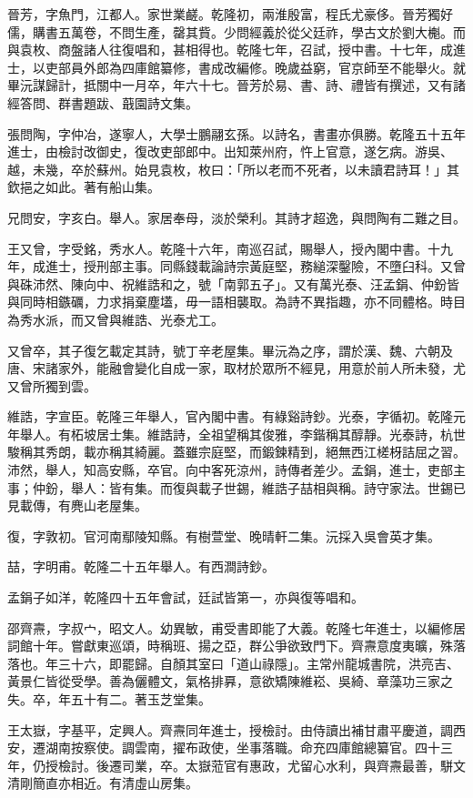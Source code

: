 \begin{pinyinscope}
晉芳，字魚門，江都人。家世業鹺。乾隆初，兩淮殷富，程氏尤豪侈。晉芳獨好儒，購書五萬卷，不問生產，罄其貲。少問經義於從父廷祚，學古文於劉大櫆。而與袁枚、商盤諸人往復唱和，甚相得也。乾隆七年，召試，授中書。十七年，成進士，以吏部員外郎為四庫館纂修，書成改編修。晚歲益窮，官京師至不能舉火。就畢沅謀歸計，抵關中一月卒，年六十七。晉芳於易、書、詩、禮皆有撰述，又有諸經答問、群書題跋、蕺園詩文集。

張問陶，字仲冶，遂寧人，大學士鵬翮玄孫。以詩名，書畫亦俱勝。乾隆五十五年進士，由檢討改御史，復改吏部郎中。出知萊州府，忤上官意，遂乞病。游吳、越，未幾，卒於蘇州。始見袁枚，枚曰：「所以老而不死者，以未讀君詩耳！」其欽挹之如此。著有船山集。

兄問安，字亥白。舉人。家居奉母，淡於榮利。其詩才超逸，與問陶有二難之目。

王又曾，字受銘，秀水人。乾隆十六年，南巡召試，賜舉人，授內閣中書。十九年，成進士，授刑部主事。同縣錢載論詩宗黃庭堅，務縋深鑿險，不墮臼科。又曾與硃沛然、陳向中、祝維誥和之，號「南郭五子」。又有萬光泰、汪孟鋗、仲鈖皆與同時相鏃礪，力求捐棄塵壒，毋一語相襲取。為詩不異指趣，亦不同體格。時目為秀水派，而又曾與維誥、光泰尤工。

又曾卒，其子復乞載定其詩，號丁辛老屋集。畢沅為之序，謂於漢、魏、六朝及唐、宋諸家外，能融會變化自成一家，取材於眾所不經見，用意於前人所未發，尤又曾所獨到雲。

維誥，字宣臣。乾隆三年舉人，官內閣中書。有綠谿詩鈔。光泰，字循初。乾隆元年舉人。有柘坡居士集。維誥詩，全祖望稱其俊雅，李鍇稱其醇靜。光泰詩，杭世駿稱其秀朗，載亦稱其綺麗。蓋雖宗庭堅，而鍛鍊精到，絕無西江槎枒詰屈之習。沛然，舉人，知高安縣，卒官。向中客死涼州，詩傳者差少。孟鋗，進士，吏部主事；仲鈖，舉人：皆有集。而復與載子世錫，維誥子喆相與稱。詩守家法。世錫已見載傳，有麂山老屋集。

復，字敦初。官河南鄢陵知縣。有樹萱堂、晚晴軒二集。沅採入吳會英才集。

喆，字明甫。乾隆二十五年舉人。有西澗詩鈔。

孟鋗子如洋，乾隆四十五年會試，廷試皆第一，亦與復等唱和。

邵齊燾，字叔宀，昭文人。幼異敏，甫受書即能了大義。乾隆七年進士，以編修居詞館十年。嘗獻東巡頌，時稱班、揚之亞，群公爭欲致門下。齊燾意度夷曠，殊落落也。年三十六，即罷歸。自顏其室曰「道山祿隱」。主常州龍城書院，洪亮吉、黃景仁皆從受學。善為儷體文，氣格排奡，意欲矯陳維崧、吳綺、章藻功三家之失。卒，年五十有二。著玉芝堂集。

王太嶽，字基平，定興人。齊燾同年進士，授檢討。由侍讀出補甘肅平慶道，調西安，遷湖南按察使。調雲南，擢布政使，坐事落職。命充四庫館總纂官。四十三年，仍授檢討。後遷司業，卒。太嶽蒞官有惠政，尤留心水利，與齊燾最善，駢文清剛簡直亦相近。有清虛山房集。


\end{pinyinscope}
